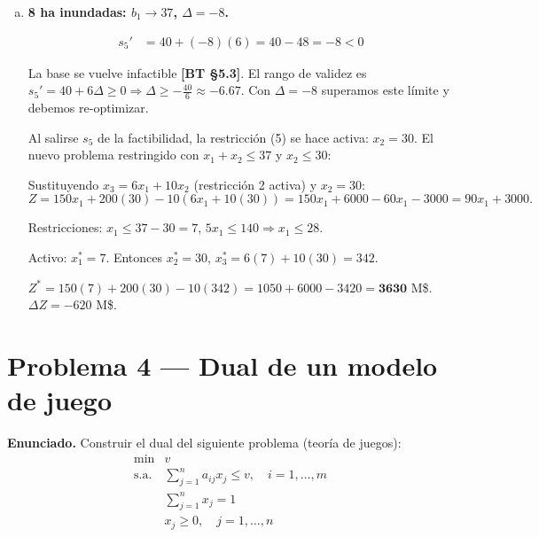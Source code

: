 \documentclass{article}
\begin{document}
\begin{enumerate}[a)]
\begin{align*}
x_1' &= 25 + (-5)\left(\tfrac{5}{2}\right) = 25 - 12.5 = 12.5 \geq 0\;\checkmark\\
x_2' &= 20 + (-5)\left(-\tfrac{3}{2}\right) = 20 + 7.5 = 27.5 \geq 0\;\checkmark\\
x_3' &= 350 \geq 0\;\checkmark\\
s_4' &= 15 + (-5)\left(-\tfrac{25}{2}\right) = 15 + 62.5 = 77.5 \geq 0\;\checkmark\\
s_5' &= 40 + (-5)(6) = 40 - 30 = 10 \geq 0\;\checkmark
\end{align*}

Base factible. Nuevo $Z' = 4250 + 75(-5) = 4250 - 375 = \mathbf{3875}$ M\$.

\item \textbf{8 ha inundadas: $b_1 \to 37$, $\Delta = -8$.}

\begin{align*}
s_5' &= 40 + (-8)(6) = 40 - 48 = -8 < 0
\end{align*}

La base se vuelve infactible \textbf{[BT §5.3]}. El rango de validez es $s_5' = 40 + 6\Delta \geq 0 \Rightarrow \Delta \geq -\tfrac{40}{6} \approx -6.67$. Con $\Delta = -8$ superamos este límite y debemos re-optimizar.

Al salirse $s_5$ de la factibilidad, la restricción (5) se hace activa: $x_2 = 30$. El nuevo problema restringido con $x_1 + x_2 \leq 37$ y $x_2 \leq 30$:

Sustituyendo $x_3 = 6x_1 + 10x_2$ (restricción 2 activa) y $x_2 = 30$:
\[
  Z = 150x_1 + 200(30) - 10(6x_1 + 10(30)) = 150x_1 + 6000 - 60x_1 - 3000 = 90x_1 + 3000.
\]

Restricciones: $x_1 \leq 37 - 30 = 7$, $5x_1 \leq 140 \Rightarrow x_1 \leq 28$.

Activo: $x_1^* = 7$. Entonces $x_2^* = 30$, $x_3^* = 6(7)+10(30) = 342$.

$Z^* = 150(7) + 200(30) - 10(342) = 1050 + 6000 - 3420 = \mathbf{3630}$ M\$. $\Delta Z = -620$ M\$.

\end{enumerate}

\section*{Problema 4 --- Dual de un modelo de juego}

\textbf{Enunciado.} Construir el dual del siguiente problema (teoría de juegos):
\[
\begin{array}{ll}
\min & v \\
\text{s.a.} & \sum_{j=1}^{n} a_{ij} x_j \leq v, \quad i = 1,\ldots,m \\
& \sum_{j=1}^{n} x_j = 1 \\
& x_j \geq 0, \quad j=1,\ldots,n
\end{array}
\]
\end{document}
